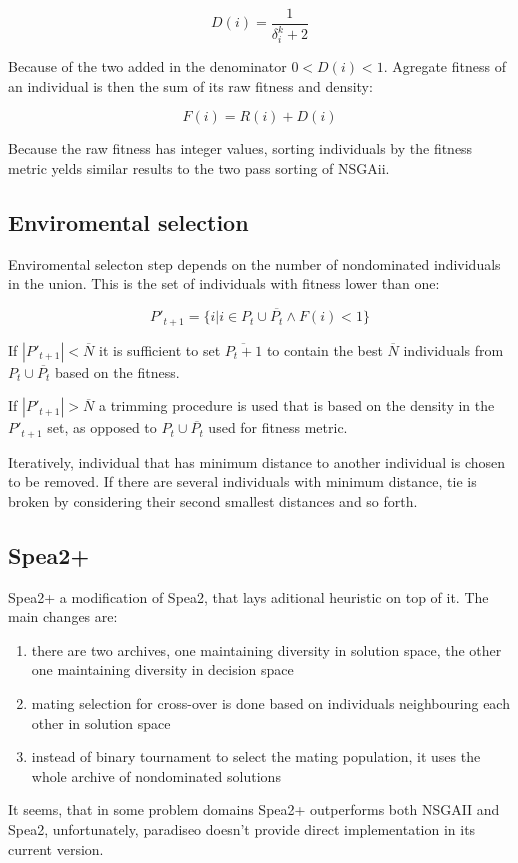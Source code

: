 \documentclass[12pt,oneside]{fithesis2}
\begin{document}
$$D(i) = \frac{1}{\delta^k_i + 2} $$

Because of the two added in the denominator  $0 < D(i) < 1$. Agregate fitness of an individual is then the sum of its raw fitness and density:

$$F(i) = R(i) + D(i) $$

Because the raw fitness has integer values, sorting individuals by the fitness metric yelds similar results to the two pass sorting of NSGAii.

\subsection{Enviromental selection}
Enviromental selecton step depends on the number of nondominated individuals in the union. This is the set of individuals with fitness lower than one:

$$P'_{t+1} =\{i | i \in P_t \cup \overline{P_t} \land F(i)<1\}$$

If $|P'_{t+1}| < \overline N$ it is sufficient to set $\overline{P_t+1}$ to contain the best $\overline N$ individuals from $P_t \cup \overline{P_t}$ based on the fitness.

If $|P'_{t+1}| > \overline N$ a trimming procedure is used that is based on the density in the $P'_{t+1}$ set, as opposed to $P_t \cup \overline{P_t}$ used for fitness metric.

Iteratively, individual that has minimum distance to another individual is chosen to be removed. If there are several individuals with minimum distance, tie is broken by considering their second smallest distances and so forth. 

\subsection{Spea2+}
Spea2+ a modification of Spea2, that lays aditional heuristic on top of it. The main changes are:
\begin{enumerate}
	\item there are two archives, one maintaining diversity in solution space, the other one maintaining diversity in decision space
	\item mating selection for cross-over is done based on individuals neighbouring each other in solution space
	\item instead of binary tournament to select the mating population, it uses the whole archive of nondominated solutions
\end{enumerate}
It seems, that in some problem domains Spea2+ outperforms both NSGAII and Spea2, unfortunately, paradiseo doesn't provide direct implementation in its current version.
\end{document}
